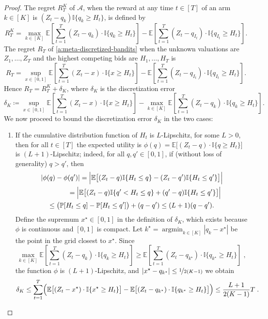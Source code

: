 \documentclass[final,12pt]{colt2025}
\newcommand{\cA}{\mathcal{A}}
\newcommand{\E}{\mathbb{E}}
\newcommand{\Pb}{\mathbb{P}}
\newcommand{\brb}[1]{\bigl(#1\bigr)}
\newcommand{\Brb}[1]{\Bigl(#1\Bigr)}
\newcommand{\lsb}[1]{\left[#1\right]}
\newcommand{\bsb}[1]{\bigl[#1\bigr]}
\newcommand{\one}[1]{\mathbb{I}\{#1\}}
\newcommand{\labs}[1]{\left\lvert#1\right\rvert}
\newcommand{\Babs}[1]{\Bigl\lvert#1\Bigr\rvert}
\DeclareMathOperator*{\argmin}{argmin}
\newcommand{\ceq}{\coloneqq}
\newcommand{\nV}{Z}
\newcommand{\nM}{H}
\begin{document}
\begin{proof}
The regret $R_T^K$ of $\cA$, when the reward at any time $t\in[T]$ of an arm $k\in[K]$ is $(\nV_t-q_k)\one{q_k \ge \nM_t}$, is defined by
\[
    R_T^K
=
    \max_{k\in[K]} \E\lsb{ \sum_{t=1}^T ( \nV_t - q_k ) \cdot \one{ q_k \geq \nM_t } }
    -
    \E\lsb{ \sum_{t=1}^T ( \nV_t - q_{ I_t } ) \cdot \one{ q_{ I_t } \geq \nM_t } }.
\]
The regret $R_T$ of \cref{a:meta-discretized-bandits} when the unknown valuations are $\nV_1,\dots,\nV_T$ and the highest competing bids are $\nM_1,\dots,\nM_T$ is
\[
    R_T
=
    \sup_{x \in [0,1] } 
    \E\lsb{ \sum_{t=1}^T ( \nV_t - x ) \cdot \one{ x \geq \nM_t } }
    -
    \E\lsb{ \sum_{t=1}^T (\nV_t - q_{ I_t } ) \cdot \one{ q_{ I_t } \geq \nM_t } }.
\]
Hence $R_T = R_T^K + \delta_K $, where $\delta_K$ is the discretization error
\[
    \delta_K
\ceq
    \sup_{x \in [0,1] } 
    \E\lsb{ \sum_{t=1}^T ( \nV_t - x ) \cdot \one{ x \geq \nM_t } }
    -
    \max_{k\in[K]} \E\lsb{ \sum_{t=1}^T ( \nV_t - q_k ) \cdot \one{ q_k \geq \nM_t } }
    .
\]
We now proceed to bound the discretization error $\delta_K$ in the two cases:
\begin{enumerate}
    \item If the cumulative distribution function of $\nM_t$ is $L$-Lipschitz, for some $L > 0$, then for all $t \in [T]$ the expected utility is $\phi(q) = \E\bsb{ ( \nV_t - q ) \cdot \one{ q \geq \nM_t } }$ is $(L+1)$-Lipschitz; indeed, for all $q,q'\in[0,1]$, if (without loss of generality) $q>q'$, then
    \begin{multline*}
        \labs{ \phi(q) - \phi(q') }
    =
        \Babs{\E \bsb{(\nV_t-q)\one{\nM_t\le q} - (\nV_t-q')\one{\nM_t\le q'} } }
    \\ \qquad\qquad =
        \Babs{\E \bsb{(\nV_t-q) \one{q' < \nM_t \le q} + (q'-q) \one{\nM_t \le q'} }}
    \\ \le
        \brb{ \Pb[\nM_t \le q] - \Pb[\nM_t \le q'] } + (q-q')
    \le 
        (L+1) (q-q') .
    \end{multline*}
    Define the supremum $x^\star \in [0, 1]$ in the definition of $\delta_K$, which exists because $\phi$ is continuous and $[0, 1]$ is compact. Let $k^\star = \argmin_{k \in [K]} |q_{k} - x^\star|$ be the point in the grid closest to $x^\star$. Since
    \[
        \max_{k\in[K]} \E\lsb{ \sum_{t=1}^T ( \nV_t - q_k ) \cdot \one{ q_k \geq \nM_t } }
    \ge
        \E\lsb{ \sum_{t=1}^T ( \nV_t - q_{k^\star} ) \cdot \one{ q_{k^\star} \geq \nM_t } } \;,
    \]
    the function $\phi$ is $(L+1)$-Lipschitz, and $\labs{ x^\star - q_{k^\star} } \le \nicefrac{1}{2(K-1)}$ we obtain
    \[
        \delta_K
    \le
        \sum_{t=1}^T \Brb{ 
            \E\bsb{ ( \nV_t - x^\star ) \cdot \one{ x^\star \geq \nM_t } }
            -
            \E\bsb{ ( \nV_t - q_{k^\star} ) \cdot \one{ q_{k^\star} \geq \nM_t } }
        }
    \le
        \frac{L+1}{2(K-1)} T \;.
    \]


\end{enumerate}
\end{proof}
\end{document}
